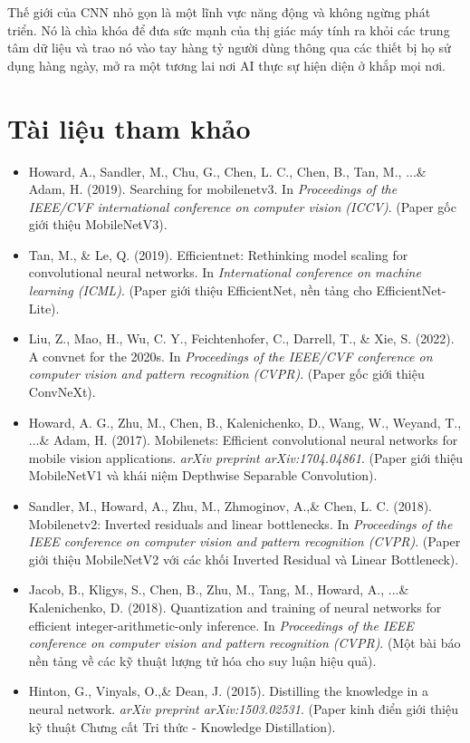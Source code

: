 Thế giới của CNN nhỏ gọn là một lĩnh vực năng động và không ngừng phát triển. Nó là chìa khóa để đưa sức mạnh của thị giác máy tính ra khỏi các trung tâm dữ liệu và trao nó vào tay hàng tỷ người dùng thông qua các thiết bị họ sử dụng hàng ngày, mở ra một tương lai nơi AI thực sự hiện diện ở khắp mọi nơi.

\section*{Tài liệu tham khảo}
\begin{itemize}
	\item[1] Howard, A., Sandler, M., Chu, G., Chen, L. C., Chen, B., Tan, M., ...\& Adam, H. (2019). Searching for mobilenetv3. In \textit{Proceedings of the IEEE/CVF international conference on computer vision (ICCV)}. (Paper gốc giới thiệu MobileNetV3).
	\item[2] Tan, M., \& Le, Q. (2019). Efficientnet: Rethinking model scaling for convolutional neural networks. In \textit{International conference on machine learning (ICML)}. (Paper giới thiệu EfficientNet, nền tảng cho EfficientNet-Lite).
	\item[3] Liu, Z., Mao, H., Wu, C. Y., Feichtenhofer, C., Darrell, T., \& Xie, S. (2022). A convnet for the 2020s. In \textit{Proceedings of the IEEE/CVF conference on computer vision and pattern recognition (CVPR)}. (Paper gốc giới thiệu ConvNeXt).
	\item[4] Howard, A. G., Zhu, M., Chen, B., Kalenichenko, D., Wang, W., Weyand, T., ...\& Adam, H. (2017). Mobilenets: Efficient convolutional neural networks for mobile vision applications. \textit{arXiv preprint arXiv:1704.04861}. (Paper giới thiệu MobileNetV1 và khái niệm Depthwise Separable Convolution).
	\item[5] Sandler, M., Howard, A., Zhu, M., Zhmoginov, A.,\& Chen, L. C. (2018). Mobilenetv2: Inverted residuals and linear bottlenecks. In \textit{Proceedings of the IEEE conference on computer vision and pattern recognition (CVPR)}. (Paper giới thiệu MobileNetV2 với các khối Inverted Residual và Linear Bottleneck).
	\item[6] Jacob, B., Kligys, S., Chen, B., Zhu, M., Tang, M., Howard, A., ...\& Kalenichenko, D. (2018). Quantization and training of neural networks for efficient integer-arithmetic-only inference. In \textit{Proceedings of the IEEE conference on computer vision and pattern recognition (CVPR)}. (Một bài báo nền tảng về các kỹ thuật lượng tử hóa cho suy luận hiệu quả).
	\item[7] Hinton, G., Vinyals, O.,\& Dean, J. (2015). Distilling the knowledge in a neural network. \textit{arXiv preprint arXiv:1503.02531}. (Paper kinh điển giới thiệu kỹ thuật Chưng cất Tri thức - Knowledge Distillation).
\end{itemize}